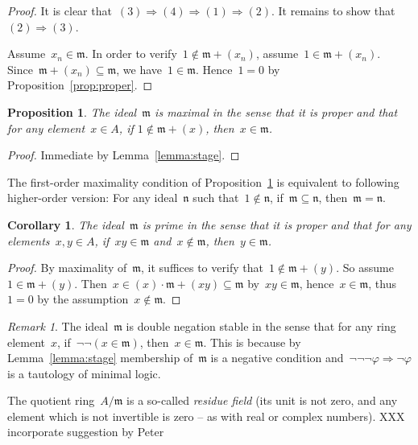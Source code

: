 \documentclass[12pt,oneside,reqno]{amsart}
\theoremstyle{definition}
\theoremstyle{plain}
\newtheorem{prop}[defn]{Proposition}
\newtheorem{cor}[defn]{Corollary}
\theoremstyle{remark}
\newtheorem{rem}[defn]{Remark}
\newcommand{\mmm}{\mathfrak{m}}
\newcommand{\nnn}{\mathfrak{n}}
\renewcommand{\_}{\mathpunct{.}\,}
\begin{document}
\begin{proof}It is clear that~$(3) \Rightarrow (4) \Rightarrow (1) \Rightarrow
(2)$. It remains to show that~$(2) \Rightarrow (3)$.

Assume~$x_n \in \mmm$. In order to verify~$1 \not\in \mmm + (x_n)$,
assume~$1 \in \mmm + (x_n)$. Since~$\mmm + (x_n) \subseteq \mmm$,
we have~$1 \in \mmm$. Hence~$1 = 0$ by Proposition~\ref{prop:proper}.\end{proof}

\begin{prop}\label{prop:is-maximal}The ideal~$\mmm$ is \emph{maximal} in the sense that it is proper and that for
any element~$x \in A$, if $1 \not\in \mmm + (x)$, then~$x \in \mmm$.\end{prop}

\begin{proof}Immediate by Lemma~\ref{lemma:stage}.\end{proof}

The first-order maximality condition of Proposition~\ref{prop:is-maximal} is
equivalent to following higher-order version: For any ideal~$\nnn$ such that~$1
\not\in \nnn$, if~$\mmm \subseteq \nnn$, then~$\mmm = \nnn$.

\begin{cor}The ideal~$\mmm$ is \emph{prime} in the sense that it is proper and that for
any elements~$x,y \in A$, if~$xy \in \mmm$ and~$x \not\in \mmm$, then~$y \in
\mmm$.\end{cor}

\begin{proof}By maximality of~$\mmm$, it suffices to verify that~$1 \not\in
\mmm + (y)$. So assume~$1 \in \mmm + (y)$. Then~$x \in (x) \cdot \mmm + (xy)
\subseteq \mmm$ by~$xy \in \mmm$, hence~$x \in \mmm$, thus~$1 = 0$ by the assumption~$x \not\in
\mmm$.\end{proof}

\begin{rem}The ideal~$\mmm$ is double negation stable in the sense that for any
ring element~$x$, if~$\neg\neg(x \in \mmm)$, then~$x \in \mmm$. This is because
by Lemma~\ref{lemma:stage} membership of~$\mmm$ is a negative condition
and~$\neg\neg\neg\varphi \Rightarrow \neg\varphi$ is a tautology of minimal
logic.\end{rem}

The quotient ring~$A/\mmm$ is a so-called \emph{residue field} (its unit is not
zero, and any element which is not invertible is zero -- as with real or
complex numbers).
XXX incorporate suggestion by Peter
\end{document}
